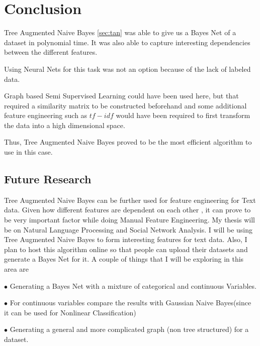 \newpage
\section{Conclusion}

Tree Augmented Naive Bayes \ref{sec:tan} was able to give us a Bayes Net of a dataset in polynomial time. It was also able to capture interesting dependencies between the different features.

Using Neural Nets for this task was not an option because of the lack of labeled data.

Graph based Semi Supervised Learning could have been used here, but that required a similarity matrix to be constructed beforehand and some additional feature engineering such as $tf-idf$ would have been required to first transform the data into a high dimensional space.

Thus, Tree Augmented Naive Bayes proved to be the most efficient algorithm to use in this case.

\subsection{Future Research}

Tree Augmented Naive Bayes can be further used for feature engineering for Text data. Given how different features are dependent on each other , it can prove to be very important factor while doing Manual Feature Engineering. My thesis will be on Natural Language Processing and Social Network Analysis. I will be using Tree Augmented Naive Bayes to form interesting features for text data. Also, I plan to host this algorithm online so that people can upload their datasets and generate a Bayes Net for it. A couple of things that I will be exploring in this area are

$\bullet$ Generating a Bayes Net with  a mixture of categorical and continuous Variables.

$\bullet$ For continuous variables compare the results with Gaussian Naive Bayes(since it can be used for Nonlinear Classification)

$\bullet$ Generating a general and more complicated graph (non tree structured) for a dataset.




